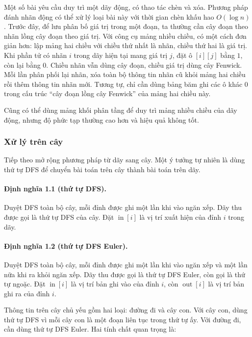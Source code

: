 \documentclass[11pt]{article}
\begin{document}
Một số bài yêu cầu duy trì một dãy động, có thao tác chèn và xóa. Phương pháp
đánh nhãn động có thể xử lý loại bài này với thời gian chèn khấu hao
\(O(\log n)\). Trước đây, để lưu phân bố giá trị trong một đoạn, ta thường cần
cây đoạn theo nhãn lồng cây đoạn theo giá trị. Với công cụ mảng nhiều chiều,
có một cách đơn giản hơn: lập mảng hai chiều với chiều thứ nhất là nhãn, chiều
thứ hai là giá trị. Khi phần tử có nhãn \(i\) trong dãy hiện tại mang giá trị
\(j\), đặt ô \([i][j]\) bằng \(1\), còn lại bằng \(0\). Chiều nhãn vẫn dùng cây
đoạn, chiều giá trị dùng cây Fenwick. Mỗi lần phân phối lại nhãn, xóa toàn bộ
thông tin nhãn cũ khỏi mảng hai chiều rồi thêm thông tin nhãn mới. Tương tự,
chỉ cần dùng bảng băm ghi các ô khác \(0\) trong cấu trúc ``cây đoạn lồng cây
Fenwick'' của mảng hai chiều này.

Cũng có thể dùng mảng khối phân tầng để duy trì mảng nhiều chiều của dãy động,
nhưng độ phức tạp thường cao hơn và hiệu quả không tốt.

\subsubsection{Xử lý trên cây}

Tiếp theo mở rộng phương pháp từ dãy sang cây. Một ý tưởng tự nhiên là dùng
thứ tự DFS để chuyển bài toán trên cây thành bài toán trên dãy.

\paragraph{Định nghĩa 1.1 (thứ tự DFS).}
Duyệt DFS toàn bộ cây, mỗi đỉnh được ghi một lần khi vào ngăn xếp. Dãy thu
được gọi là thứ tự DFS của cây. Đặt \(\operatorname{in}[i]\) là vị trí xuất
hiện của đỉnh \(i\) trong dãy.

\paragraph{Định nghĩa 1.2 (thứ tự DFS Euler).}
Duyệt DFS toàn bộ cây, mỗi đỉnh được ghi một lần khi vào ngăn xếp và một lần
nữa khi ra khỏi ngăn xếp. Dãy thu được gọi là thứ tự DFS Euler, còn gọi là
thứ tự ngoặc. Đặt \(\operatorname{in}[i]\) là vị trí bản ghi vào của đỉnh
\(i\), còn \(\operatorname{out}[i]\) là vị trí bản ghi ra của đỉnh \(i\).

Thông tin trên cây chủ yếu gồm hai loại: đường đi và cây con. Với cây con, dùng
thứ tự DFS vì mỗi cây con là một đoạn liên tục trong thứ tự ấy. Với đường đi,
cần dùng thứ tự DFS Euler. Hai tính chất quan trọng là:
\end{document}
